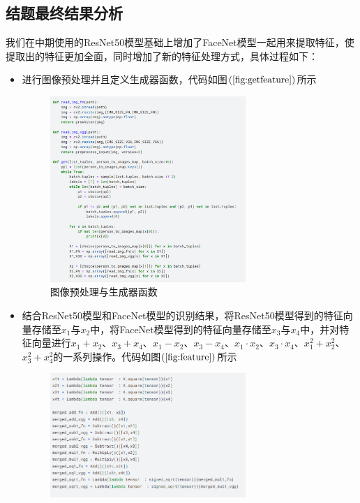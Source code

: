 \documentclass[UTF8]{ctexart}
\begin{document}
\subsection{结题最终结果分析}
我们在中期使用的ResNet50模型基础上增加了FaceNet模型一起用来提取特征，使提取出的特征更加全面，同时增加了新的特征处理方式，具体过程如下：
\begin{itemize}
  \item 进行图像预处理并且定义生成器函数，代码如图$\left(\ref{fig:getfeature}\right)$所示
  \begin{figure}[!ht]
    \centering
    \includegraphics[width=0.7\textwidth]{getfeature.png}
    \caption{图像预处理与生成器函数}
    \label{fig:getfeature}
  \end{figure}
  \item 结合ResNet50模型和FaceNet模型的识别结果，将ResNet50模型得到的特征向量存储至$x_1$与$x_2$中，将FaceNet模型得到的特征向量存储至$x_3$与$x_4$中，并对特征向量进行$x_1+x_2$、$x_3+x_4$、$x_1-x_2$、$x_3-x_4$、$x_1\cdot x_2$、$x_3\cdot x_4$、$x_1^2+x_2^2$、$x_3^2+x_4^2$的一系列操作。代码如图$\left(\ref{fig:feature}\right)$所示
  \begin{figure}[!ht]
    \centering
    \includegraphics[width=0.7\textwidth]{feature.png}

\end{figure}
\end{itemize}
\end{document}
